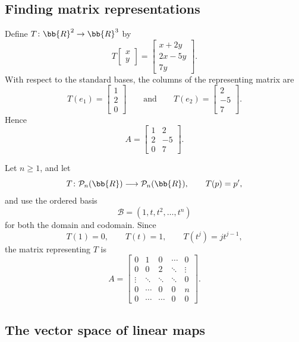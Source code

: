 \subsection{Finding matrix representations}

\begin{example}
  Define $T\colon\bb{R}^2\to\bb{R}^3$ by
  \[
    T\begin{bmatrix}x\\y\end{bmatrix}
    =\begin{bmatrix}x+2y\\2x-5y\\7y\end{bmatrix}.
  \]
  With respect to the standard bases, the columns of the representing
  matrix are
  \[
    T(e_1)=\begin{bmatrix}1\\2\\0\end{bmatrix}
    \qquad\text{and}\qquad
    T(e_2)=\begin{bmatrix}2\\-5\\7\end{bmatrix}.
  \]
  Hence
  \[
    A=
    \begin{bmatrix}
      1&2\\
      2&-5\\
      0&7
    \end{bmatrix}.
  \]
\end{example}

\begin{example}[Differentiation]
  Let $n\geq1$, and let
  \[
    T\colon\mathcal P_n(\bb{R})\longrightarrow\mathcal P_n(\bb{R}),
    \qquad T(p)=p',
  \]
  and use the ordered basis
  \[
    \mathcal B=(1,t,t^2,\ldots,t^n)
  \]
  for both the domain and codomain. Since
  \[
    T(1)=0,
    \qquad
    T(t)=1,
    \qquad
    T(t^j)=jt^{j-1},
  \]
  the matrix representing $T$ is
  \[
    A=
    \begin{bmatrix}
      0&1&0&\cdots&0\\
      0&0&2&\ddots&\vdots\\
      \vdots&\ddots&\ddots&\ddots&0\\
      0&\cdots&0&0&n\\
      0&\cdots&\cdots&0&0
    \end{bmatrix}.
  \]
\end{example}

\subsection{The vector space of linear maps}

